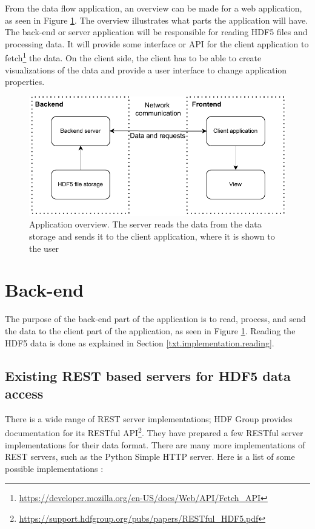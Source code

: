 From the data flow application, an overview can be made for a web application, as seen in Figure \ref{fig:app_overview}. The overview illustrates what parts the application will have. The back-end or server application will be responsible for reading HDF5 files and processing data. It will provide some interface or API for the client application to fetch\footnote{\url{https://developer.mozilla.org/en-US/docs/Web/API/Fetch\_API}} the data. On the client side, the client has to be able to create visualizations of the data and provide a user interface to change application properties.

\begin{figure}
    \centering
    \includegraphics{pdf/appstack_general.drawio.pdf}
    \caption{Application overview. The server reads the data from the data storage and sends it to the client application, where it is shown to the user}
    \label{fig:app_overview}
\end{figure}


\section{Back-end}\label{txt.design.backend}

The purpose of the back-end part of the application is to read, process, and send the data to the client part of the application, as seen in Figure \ref{fig:app_overview}. Reading the HDF5 data is done as explained in Section \ref{txt.implementation.reading}.


\subsection{Existing REST based servers for HDF5 data access}\label{txt.design.rest}

There is a wide range of REST server implementations; HDF Group provides documentation for its RESTful API\footnote{\url{https://support.hdfgroup.org/pubs/papers/RESTful\_HDF5.pdf}}. They have prepared a few RESTful server implementations for their data format. There are many more implementations of REST servers, such as the Python Simple HTTP server. Here is a list of some possible implementations \cite{hdfrest}:

